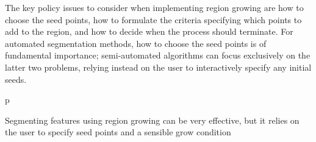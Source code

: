 The key policy issues to consider when implementing region growing are how to choose the seed points, how to formulate the criteria specifying which points to add to the region, and how to decide when the process should terminate. For automated segmentation methods, how to choose the seed points is of fundamental importance; semi-automated algorithms can focus exclusively on the latter two problems, relying instead on the user to interactively specify any initial seeds.

\begin{stusubfig}{p}
	\hspace{4mm}%
\caption{Segmenting features using region growing can be very effective, but it relies on the user to specify seed points and a sensible grow condition}
\label{fig:background-segmentation-regiongrowing-ct}
\end{stusubfig}

